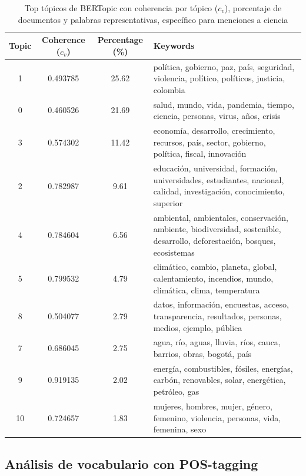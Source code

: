 \documentclass[11pt,a4paper]{article}
\begin{document}
		\begin{table}[H]
			\centering
			\small
			\begin{tabularx}{\textwidth}{c c c X}
				\hline
				\textbf{Topic} & \textbf{Coherence ($c_v$)} & \textbf{Percentage (\%)} & \textbf{Keywords} \\
				\hline
				1  & 0.493785 & 25.62 & política, gobierno, paz, país, seguridad, violencia, político, políticos, justicia, colombia \\
				0  & 0.460526 & 21.69 & salud, mundo, vida, pandemia, tiempo, ciencia, personas, virus, años, crisis \\
				3  & 0.574302 & 11.42 & economía, desarrollo, crecimiento, recursos, país, sector, gobierno, política, fiscal, innovación \\
				2  & 0.782987 & 9.61  & educación, universidad, formación, universidades, estudiantes, nacional, calidad, investigación, conocimiento, superior \\
				4  & 0.784604 & 6.56  & ambiental, ambientales, conservación, ambiente, biodiversidad, sostenible, desarrollo, deforestación, bosques, ecosistemas \\
				5  & 0.799532 & 4.79  & climático, cambio, planeta, global, calentamiento, incendios, mundo, climática, clima, temperatura \\
				8  & 0.504077 & 2.79  & datos, información, encuestas, acceso, transparencia, resultados, personas, medios, ejemplo, pública \\
				7  & 0.686045 & 2.75  & agua, río, aguas, lluvia, ríos, cauca, barrios, obras, bogotá, país \\
				9  & 0.919135 & 2.02  & energía, combustibles, fósiles, energías, carbón, renovables, solar, energética, petróleo, gas \\
				10 & 0.724657 & 1.83  & mujeres, hombres, mujer, género, femenino, violencia, personas, vida, femenina, sexo \\
				\hline
			\end{tabularx}
			\caption{Top tópicos de BERTopic con coherencia por tópico ($c_v$), porcentaje de documentos y palabras representativas, específico para menciones a ciencia}
			\label{tab:topics_ciencia}
		\end{table}
		
		
		
	\subsection{Análisis de vocabulario con POS-tagging}
\end{document}
